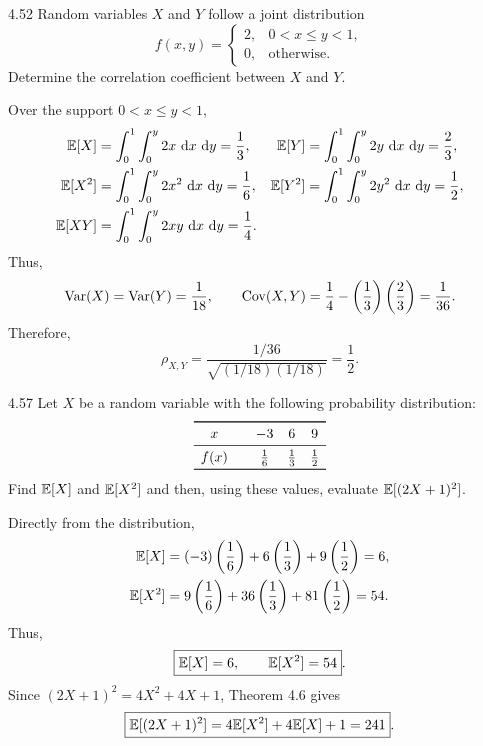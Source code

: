 \documentclass[11pt,oneside]{article}
\begin{document}
\begin{exercise}{4.52}
Random variables $X$ and $Y$ follow a joint distribution
\[
    f(x,y)=
    \begin{cases}
        2, & 0<x\leq y<1,\\
        0, & \text{otherwise}.
    \end{cases}
\]
Determine the correlation coefficient between $X$ and $Y$.
\end{exercise}

\begin{solution}
Over the support $0<x\leq y<1$,
\[
\begin{aligned}
    \Exp[X]
    &=\int_0^1\int_0^y 2x\,\dd x\,\dd y=\frac13,
    &
    \Exp[Y]
    &=\int_0^1\int_0^y 2y\,\dd x\,\dd y=\frac23,\\
    \Exp[X^2]
    &=\int_0^1\int_0^y 2x^2\,\dd x\,\dd y=\frac16,
    &
    \Exp[Y^2]
    &=\int_0^1\int_0^y 2y^2\,\dd x\,\dd y=\frac12,\\
    \Exp[XY]
    &=\int_0^1\int_0^y 2xy\,\dd x\,\dd y=\frac14.
\end{aligned}
\]
Thus,
\[
    \operatorname{Var}(X)=\operatorname{Var}(Y)=\frac1{18},
    \qquad
    \operatorname{Cov}(X,Y)=\frac14-\left(\frac13\right)\left(\frac23\right)=\frac1{36}.
\]
Therefore,
\[
    \boxed{\rho_{X,Y}
    =\frac{1/36}{\sqrt{(1/18)(1/18)}}
    =\frac12}.
\]
\end{solution}

\begin{exercise}{4.57}
Let $X$ be a random variable with the following probability distribution:
\[
\begin{array}{c@{\qquad}ccc}
\toprule
x & -3 & 6 & 9 \\
\midrule
f(x) & \frac16 & \frac13 & \frac12 \\
\bottomrule
\end{array}
\]
Find $\mathbb{E}[X]$ and $\mathbb{E}[X^2]$ and then, using these values, evaluate $\mathbb{E}[(2X+1)^2]$.
\end{exercise}

\begin{solution}
Directly from the distribution,
\[
\begin{aligned}
    \mathbb{E}[X]
    &=(-3)\left(\frac16\right)
      +6\left(\frac13\right)
      +9\left(\frac12\right)
      =6,\\
    \mathbb{E}[X^2]
    &=9\left(\frac16\right)
      +36\left(\frac13\right)
      +81\left(\frac12\right)
      =54.
\end{aligned}
\]
Thus,
\[
    \boxed{\mathbb{E}[X]=6,\qquad \mathbb{E}[X^2]=54}.
\]
Since $(2X+1)^2=4X^2+4X+1$, Theorem 4.6 gives
\[
    \boxed{\mathbb{E}[(2X+1)^2]
    =4\mathbb{E}[X^2]+4\mathbb{E}[X]+1
    =241}.
\]
\end{solution}
\end{document}
